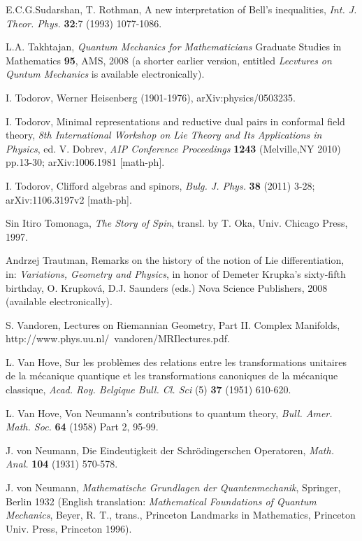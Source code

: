 \documentclass[12pt]{article}
\begin{document}
\begin{thebibliography}{000}
 E.C.G.Sudarshan, T. Rothman, A new interpretation of Bell's inequalities, {\it Int. J.
Theor. Phys.} {\bf 32}:7 (1993) 1077-1086.

 L.A. Takhtajan, {\it Quantum Mechanics for Mathematicians} Graduate Studies in Mathematics {\bf 95}, AMS, 2008 (a shorter earlier version, entitled {\it Lecvtures on Quntum Mechanics} is available electronically).

 I. Todorov, Werner Heisenberg (1901-1976), arXiv:physics/0503235.

 I. Todorov, Minimal representations and reductive dual pairs
 in conformal field theory, {\it 8th International Workshop on Lie Theory and
Its Applications in Physics}, ed. V. Dobrev, {\it AIP Conference Proceedings}
{\bf 1243} (Melville,NY 2010) pp.13-30; arXiv:1006.1981 [math-ph].

 I. Todorov,  Clifford algebras and spinors, {\it Bulg. J. Phys.} {\bf 38} (2011) 3-28;
 arXiv:1106.3197v2 [math-ph].
                                     

  Sin Itiro Tomonaga, {\it The Story of Spin}, transl. by T. Oka,  
 Univ. Chicago Press, 1997. 

 Andrzej Trautman, Remarks on the history of the notion of Lie
differentiation, in: {\it Variations, Geometry and Physics}, in honor of Demeter
Krupka's sixty-fifth birthday, O. Krupkov\'a, D.J. Saunders (eds.) Nova Science
 Publishers, 2008 (available electronically).

 S. Vandoren, Lectures on Riemannian Geometry, Part II. Complex
Manifolds, http://www.phys.uu.nl/~vandoren/MRIlectures.pdf.

 L. Van Hove, Sur les probl\`emes des relations entre les transformations unitaires de la
m\'ecanique quantique et les transformations canoniques de la m\'ecanique classique, {\it Acad. Roy. Belgique
Bull. Cl. Sci} (5) {\bf 37} (1951) 610-620.

 L. Van Hove, Von Neumann's contributions to quantum theory, {\it Bull. Amer. Math. Soc.} {\bf 64} (1958) Part 2, 95-99.

 J. von Neumann, Die Eindeutigkeit der Schr\"odingerschen Operatoren, {\it Math. Anal.}
{\bf 104} (1931) 570-578.

 J. von Neumann, {\it Mathematische Grundlagen der Quantenmechanik}, Springer, Berlin 1932 (English translation: {\it Mathematical Foundations of Quantum Mechanics}, Beyer, R. T., trans., Princeton Landmarks in Mathematics, Princeton Univ. Press, Princeton 1996).


\end{thebibliography}
\end{document}
